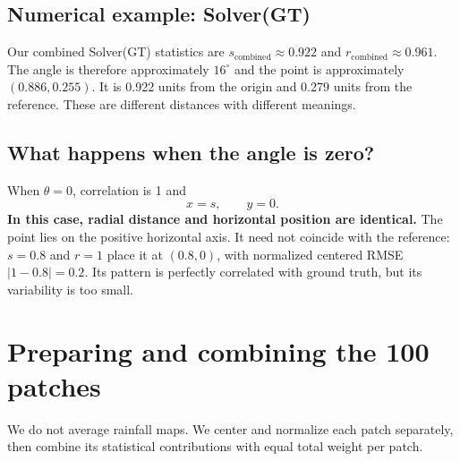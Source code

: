 \documentclass[11pt,a4paper]{article}
\begin{document}
\begin{center}
\end{center}

\subsection*{Numerical example: Solver(GT)}
Our combined Solver(GT) statistics are $s_{\mathrm{combined}}\approx0.922$ and $r_{\mathrm{combined}}\approx0.961$. The angle is therefore approximately $16^\circ$ and the point is approximately $(0.886,0.255)$. It is 0.922 units from the origin and 0.279 units from the reference. These are different distances with different meanings.

\subsection*{What happens when the angle is zero?}
When $\theta=0$, correlation is 1 and
\[
x=s,\qquad y=0.
\]
\textbf{In this case, radial distance and horizontal position are identical.} The point lies on the positive horizontal axis. It need not coincide with the reference: $s=0.8$ and $r=1$ place it at $(0.8,0)$, with normalized centered RMSE $|1-0.8|=0.2$. Its pattern is perfectly correlated with ground truth, but its variability is too small.

\newpage
\section*{Preparing and combining the 100 patches}

We do not average rainfall maps. We center and normalize each patch separately, then combine its statistical contributions with equal total weight per patch.
\end{document}
